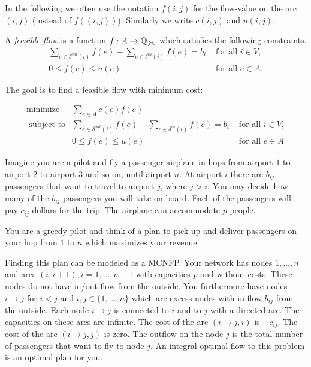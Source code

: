 In the following we often use the notation $f(i,j)$ for the flow-value
on the arc $(i,j)$ (instead of $f((i,j))$). Similarly we write
$c(i,j)$ and $u(i,j)$. 

A \emph{feasible flow} is a function $f:A \to \mathbb{Q}_{\geqslant0}$ which
satisfies the following constraints. 
\begin{displaymath}  
  \begin{array}{cl}
    \sum_{e \in \delta^{out}(i)} f{(e)} - 
    \sum_{e \in \delta^{in}(i)} f(e) =b_i & 
    \text{ for all } i \in V, \\
    0 \leq f{(e)} \leq u{(e)}              & \text{ for all } e \in A.
  \end{array}
\end{displaymath}


The goal is to find a feasible flow with minimum cost: 


  \begin{displaymath}
    \begin{array}{rcl}
      \text{minimize}     & \sum_{e \in A} c(e) f(e) &     \\
      \text{ subject to}  & \sum_{e \in \delta^{out}(i)} f(e) - \sum_{e\in \delta^{in}(i)} f(e) =b_i & \text{ for all } i \in V,\\
                          & 0 \leq f(e) \leq u(e)              &
                          \text{ for all } e \in A 
    \end{array}
  \end{displaymath}
  

  \begin{example}
    Imagine you are a pilot and fly a passenger airplane in
    hops from airport $1$ to airport $2$ to airport $3$ and so on, 
    until airport $n$.  At airport $i$ there are $b_{ij}$ passengers 
    that want to travel to airport $j$, where $j>i$. You may decide 
    how many of the $b_{ij}$ passengers you will take on board. Each 
    of the passengers will pay $c_{ij}$ dollars for the trip. The 
    airplane can accommodate $p$ people. 

    You are a greedy pilot and think of a plan to pick up and deliver
    passengers on your hop from $1$ to $n$ which maximizes your
    revenue. 

    Finding this plan can be modeled as a MCNFP. 
    Your network has nodes $1,\ldots,n$ and arcs
    $(i,i+1), i=1,\ldots,n-1$ with capacities $p$ and  without
    costs. These nodes do not have  in/out-flow from   the outside. 
    You furthermore have nodes $i\to j$ for $i<j$ and 
    $i,j \in \{1,\ldots,n\}$ which are excess nodes with in-flow 
    $b_{ij}$ from the outside. Each node $i\to j$ is connected to
    $i$ and to $j$ with a directed arc. The capacities on these arcs
    are infinite. The cost of the arc $(i\to j,i)$ is $-c_{ij}$. 
    The cost of the arc $(i\to j,j)$ is zero. The outflow on the 
    node $j$ is the total number of passengers that want to fly to 
    node $j$. An integral optimal flow to this problem is an optimal 
    plan for you. 
  \end{example}


